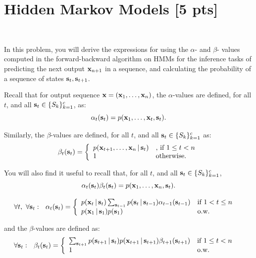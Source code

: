 \documentclass[submit]{harvardml}
\begin{document}
\section*{Hidden Markov Models [5 pts]}
\begin{problem}
  ~

  In this problem, you will derive the expressions for using the
  $\alpha$- and $\beta$- values computed in the forward-backward
  algorithm on HMMs for the inference tasks of predicting the next
  output $\mathbf{x}_{n+1}$ in a sequence, and calculating the probability
  of a sequence of states $\mathbf{s}_t,\mathbf{s}_{t+1}$.

Recall that for output sequence $\mathbf{x}=(\mathbf{x}_1,\ldots,\mathbf{x}_n)$,
the $\alpha$-values are defined, for all $t$, and all
$\mathbf{s}_t\in \{S_k\}_{k=1}^c$, as:
%
$$
\alpha_t(\mathbf{s}_t)=p(\mathbf{x}_1,\ldots,\mathbf{x}_t,\mathbf{s}_t).
$$

Similarly, the $\beta$-values are defined, for all $t$, and all
$\mathbf{s}_t\in \{S_k\}_{k=1}^c$ as:
%
\begin{align*}
\beta_t(\mathbf{s}_t) = \left\{
\begin{array}{ll}
p(\mathbf{x}_{t+1},\ldots, \mathbf{x}_n\,|\, \mathbf{s}_t)
&\mbox{, if $1\leq t<n$}\\
1 & \mbox{otherwise.}
\end{array}
\right.
\end{align*}

You will also find it useful to recall that, 
for all $t$, and all $\mathbf{s}_t\in \{S_k\}_{k=1}^c$,
%
$$
\alpha_t(\mathbf{s}_t)\beta_t(\mathbf{s}_t)=p(\mathbf{x}_1,\ldots,\mathbf{x}_n,\mathbf{s}_t).
$$


\begin{align*}
\forall t,\ \forall \bolds_t:\ \ 
\alpha_t(\bolds_t)&=\left\{
\begin{array}{ll}
p(\boldx_t\given \bolds_t)\sum_{\bolds_{t-1}} p(\bolds_t\given\bolds_{t-1})\alpha_{t-1}(\bolds_{t-1}) &\mbox{if $1<t\leq n$}\\
p(\boldx_1\given \bolds_1)p(\bolds_1) &\mbox{o.w.}
\end{array}
\right.
\end{align*}

and the $\beta$-values are defined as:
\begin{align*}
\forall \bolds_t:\ \ 
\beta_t(\bolds_t)&=\left\{
\begin{array}{ll}
\sum_{\bolds_{t+1}} p(\bolds_{t+1}\given\bolds_{t})
p(\boldx_{t+1}\given\bolds_{t+1})\beta_{t+1}(\bolds_{t+1})
&\mbox{if $1\leq t< n$}\\
1 &\mbox{o.w.}
\end{array}
\right.
\end{align*}
\fi


\end{problem}
\end{document}
